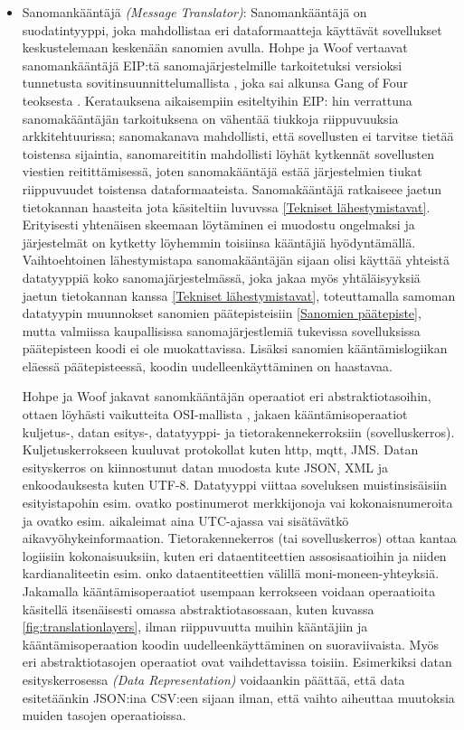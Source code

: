 \begin{itemize}
   \item Sanomankääntäjä \textit{(Message Translator)}:
      Sanomankääntäjä on suodatintyyppi, joka mahdollistaa eri dataformaatteja käyttävät sovellukset keskustelemaan keskenään sanomien avulla. Hohpe ja Woof vertaavat sanomankääntäjä EIP:tä sanomajärjestelmille tarkoitetuksi versioksi tunnetusta sovitinsuunnittelumallista \citep[sivu~97]{Hohpe2004}, joka sai alkunsa Gang of Four teoksesta \citep{Gamma1994}.
      Keratauksena aikaisempiin esiteltyihin EIP: hin verrattuna sanomakääntäjän tarkoituksena on vähentää tiukkoja riippuvuuksia arkkitehtuurissa; sanomakanava mahdollisti, että sovellusten ei tarvitse tietää toistensa sijaintia, sanomareititin mahdollisti löyhät kytkennät sovellusten viestien reitittämisessä, joten sanomakääntäjä estää järjestelmien tiukat riippuvuudet toistensa dataformaateista.
      Sanomakääntäjä ratkaiseee jaetun tietokannan haasteita jota käsiteltiin luvuvssa \ref{Tekniset lähestymistavat}. Erityisesti yhtenäisen skeemaan löytäminen ei muodostu ongelmaksi ja järjestelmät on  kytketty löyhemmin toisiinsa kääntäjiä hyödyntämällä.
      Vaihtoehtoinen lähestymistapa sanomakääntäjän sijaan olisi käyttää yhteistä datatyyppiä koko sanomajärjestelmässä, joka jakaa myös yhtäläisyyksiä jaetun tietokannan kanssa \ref{Tekniset lähestymistavat}, toteuttamalla samoman datatyypin muunnokset sanomien päätepisteisiin \ref{Sanomien päätepiste}, mutta valmiissa kaupallisissa sanomajärjestlemiä tukevissa sovelluksissa päätepisteen koodi ei ole muokattavissa. Lisäksi sanomien kääntämislogiikan eläessä päätepisteessä, koodin uudelleenkäyttäminen on haastavaa.

      Hohpe ja Woof \citep{Hohpe2004} jakavat sanomkääntäjän operaatiot eri abstraktiotasoihin, ottaen löyhästi vaikutteita OSI-mallista \citep{OSImodel}, jakaen kääntämisoperaatiot kuljetus-, datan esitys-, datatyyppi- ja tietorakennekerroksiin (sovelluskerros).
      Kuljetuskerrokseen kuuluvat protokollat kuten http, mqtt, JMS. Datan esityskerros on kiinnostunut datan muodosta kute JSON, XML ja enkoodauksesta kuten UTF-8. Datatyyppi viittaa soveluksen muistinsisäisiin esityistapohin esim. ovatko postinumerot merkkijonoja vai kokonaisnumeroita ja ovatko esim. aikaleimat aina UTC-ajassa vai sisätävätkö aikavyöhykeinformaation.
      Tietorakennekerros (tai sovelluskerros) ottaa kantaa logiisiin kokonaisuuksiin, kuten eri dataentiteettien assosisaatioihin ja niiden kardianaliteetin esim. onko dataentiteettien välillä moni-moneen-yhteyksiä.
      Jakamalla kääntämisoperaatiot usempaan kerrokseen voidaan operaatioita käsitellä itsenäisesti omassa abstraktiotasossaan, kuten kuvassa \ref{fig:translationlayers}, ilman riippuvuutta muihin kääntäjiin ja kääntämisoperaation koodin uudelleenkäyttäminen on suoraviivaista. Myös eri abstraktiotasojen operaatiot ovat vaihdettavissa toisiin. Esimerkiksi datan esityskerrosessa \textit{(Data Representation)} voidaankin päättää, että data esitetäänkin JSON:ina CSV:een sijaan ilman, että vaihto aiheuttaa muutoksia muiden tasojen operaatioissa.


\end{itemize}
